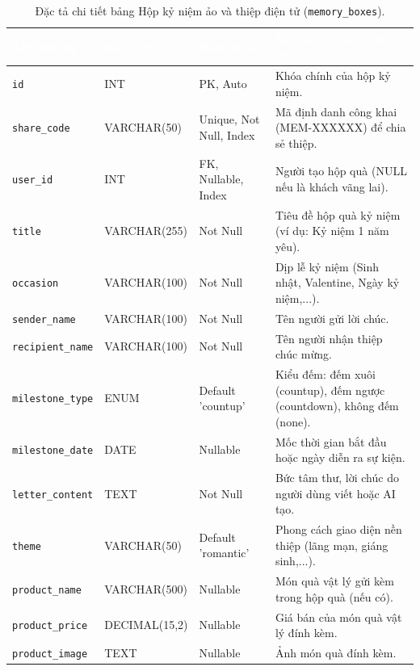 \begin{table}[htbp]
\centering
\caption{Đặc tả chi tiết bảng Hộp kỷ niệm ảo và thiệp điện tử (\texttt{memory\_boxes}).}
\label{tab:db_memory}
\small
\renewcommand{\arraystretch}{1.25}
\begin{tabularx}{\textwidth}{|p{3.0cm}|p{2.6cm}|p{2.8cm}|X|}
\hline
\rowcolor{PrimaryBlue}
\textcolor{white}{\textbf{Tên trường}} &
\textcolor{white}{\textbf{Kiểu dữ liệu}} &
\textcolor{white}{\textbf{Ràng buộc}} &
\textcolor{white}{\textbf{Mô tả ý nghĩa nghiệp vụ}} \\
\hline
\texttt{id} & INT & PK, Auto & Khóa chính của hộp kỷ niệm. \\
\hline
\texttt{share\_code} & VARCHAR(50) & Unique, Not Null, Index & Mã định danh công khai (MEM-XXXXXX) để chia sẻ thiệp. \\
\hline
\texttt{user\_id} & INT & FK, Nullable, Index & Người tạo hộp quà (NULL nếu là khách vãng lai). \\
\hline
\texttt{title} & VARCHAR(255) & Not Null & Tiêu đề hộp quà kỷ niệm (ví dụ: Kỷ niệm 1 năm yêu). \\
\hline
\texttt{occasion} & VARCHAR(100) & Not Null & Dịp lễ kỷ niệm (Sinh nhật, Valentine, Ngày kỷ niệm,...). \\
\hline
\texttt{sender\_name} & VARCHAR(100) & Not Null & Tên người gửi lời chúc. \\
\hline
\texttt{recipient\_name} & VARCHAR(100) & Not Null & Tên người nhận thiệp chúc mừng. \\
\hline
\texttt{milestone\_type} & ENUM & Default 'countup' & Kiểu đếm: đếm xuôi (countup), đếm ngược (countdown), không đếm (none). \\
\hline
\texttt{milestone\_date} & DATE & Nullable & Mốc thời gian bắt đầu hoặc ngày diễn ra sự kiện. \\
\hline
\texttt{letter\_content} & TEXT & Not Null & Bức tâm thư, lời chúc do người dùng viết hoặc AI tạo. \\
\hline
\texttt{theme} & VARCHAR(50) & Default 'romantic' & Phong cách giao diện nền thiệp (lãng mạn, giáng sinh,...). \\
\hline
\texttt{product\_name} & VARCHAR(500) & Nullable & Món quà vật lý gửi kèm trong hộp quà (nếu có). \\
\hline
\texttt{product\_price} & DECIMAL(15,2) & Nullable & Giá bán của món quà vật lý đính kèm. \\
\hline
\texttt{product\_image} & TEXT & Nullable & Ảnh món quà đính kèm. \\

\end{tabularx}
\end{table}
